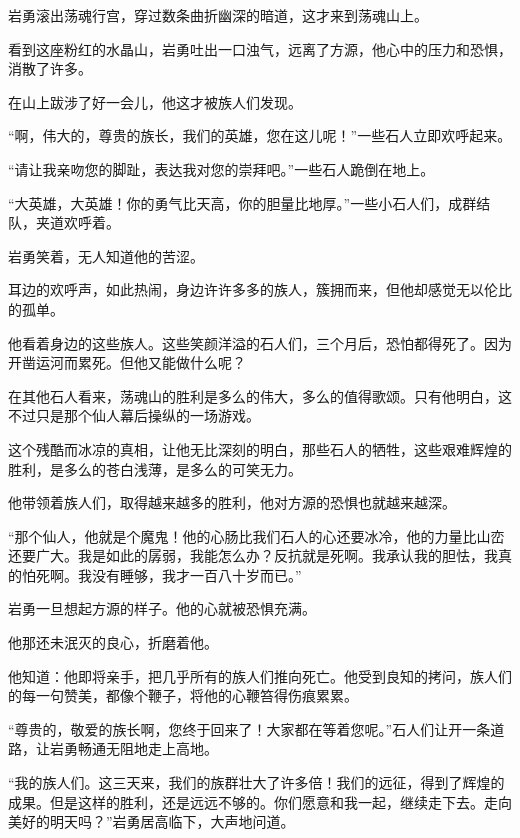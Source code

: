 
\begin{this_body}



岩勇滚出荡魂行宫，穿过数条曲折幽深的暗道，这才来到荡魂山上。

看到这座粉红的水晶山，岩勇吐出一口浊气，远离了方源，他心中的压力和恐惧，消散了许多。

在山上跋涉了好一会儿，他这才被族人们发现。

“啊，伟大的，尊贵的族长，我们的英雄，您在这儿呢！”一些石人立即欢呼起来。

“请让我亲吻您的脚趾，表达我对您的崇拜吧。”一些石人跪倒在地上。

“大英雄，大英雄！你的勇气比天高，你的胆量比地厚。”一些小石人们，成群结队，夹道欢呼着。

岩勇笑着，无人知道他的苦涩。

耳边的欢呼声，如此热闹，身边许许多多的族人，簇拥而来，但他却感觉无以伦比的孤单。

他看着身边的这些族人。这些笑颜洋溢的石人们，三个月后，恐怕都得死了。因为开凿运河而累死。但他又能做什么呢？

在其他石人看来，荡魂山的胜利是多么的伟大，多么的值得歌颂。只有他明白，这不过只是那个仙人幕后操纵的一场游戏。

这个残酷而冰凉的真相，让他无比深刻的明白，那些石人的牺牲，这些艰难辉煌的胜利，是多么的苍白浅薄，是多么的可笑无力。

他带领着族人们，取得越来越多的胜利，他对方源的恐惧也就越来越深。

“那个仙人，他就是个魔鬼！他的心肠比我们石人的心还要冰冷，他的力量比山峦还要广大。我是如此的孱弱，我能怎么办？反抗就是死啊。我承认我的胆怯，我真的怕死啊。我没有睡够，我才一百八十岁而已。”

岩勇一旦想起方源的样子。他的心就被恐惧充满。

他那还未泯灭的良心，折磨着他。

他知道：他即将亲手，把几乎所有的族人们推向死亡。他受到良知的拷问，族人们的每一句赞美，都像个鞭子，将他的心鞭笞得伤痕累累。

“尊贵的，敬爱的族长啊，您终于回来了！大家都在等着您呢。”石人们让开一条道路，让岩勇畅通无阻地走上高地。

“我的族人们。这三天来，我们的族群壮大了许多倍！我们的远征，得到了辉煌的成果。但是这样的胜利，还是远远不够的。你们愿意和我一起，继续走下去。走向美好的明天吗？”岩勇居高临下，大声地问道。


\end{this_body}

